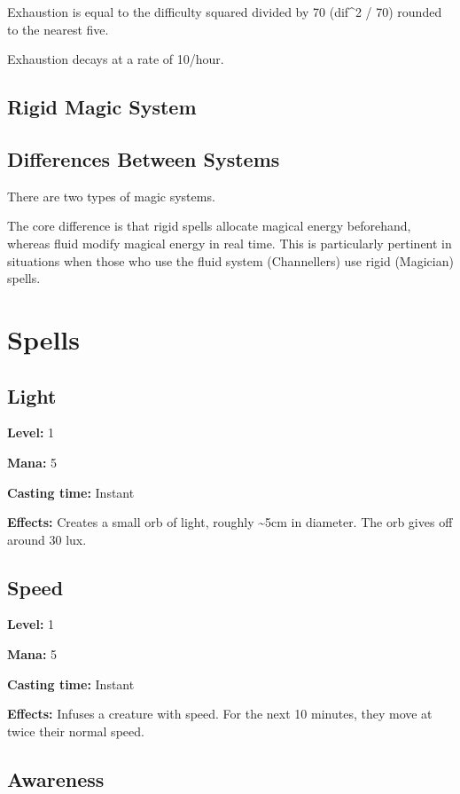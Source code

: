 \documentclass[]{article}
\begin{document}
Exhaustion is equal to the difficulty squared divided by 70 (dif\^{}2 /
70) rounded to the nearest five.

Exhaustion decays at a rate of 10/hour.

\subsection{Rigid Magic System}\label{rigid-magic-system}

\subsection{Differences Between
Systems}\label{differences-between-systems}

There are two types of magic systems.

The core difference is that rigid spells allocate magical energy
beforehand, whereas fluid modify magical energy in real time. This is
particularly pertinent in situations when those who use the fluid system
(Channellers) use rigid (Magician) spells.

\section{Spells}\label{spells}

\subsection{Light}\label{light-1}

\textbf{Level:} 1

\textbf{Mana:} 5

\textbf{Casting time:} Instant

\textbf{Effects:} Creates a small orb of light, roughly
\textasciitilde{}5cm in diameter. The orb gives off around 30 lux.

\subsection{Speed}\label{speed-1}

\textbf{Level:} 1

\textbf{Mana:} 5

\textbf{Casting time:} Instant

\textbf{Effects:} Infuses a creature with speed. For the next 10
minutes, they move at twice their normal speed.

\subsection{Awareness}\label{awareness}
\end{document}
